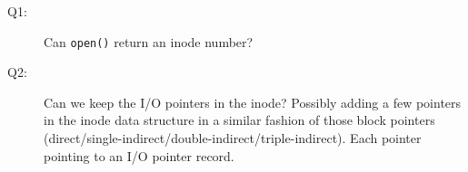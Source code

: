 \begin{description}
\item[Q1:] Can \texttt{open()} return an inode number?
\item[Q2:] Can we keep the I/O pointers in the inode? Possibly adding a few pointers in
  the inode data structure in a similar fashion of those block pointers
  (direct/single-indirect/double-indirect/triple-indirect). Each pointer pointing to an
  I/O pointer record. 
\end{description}

